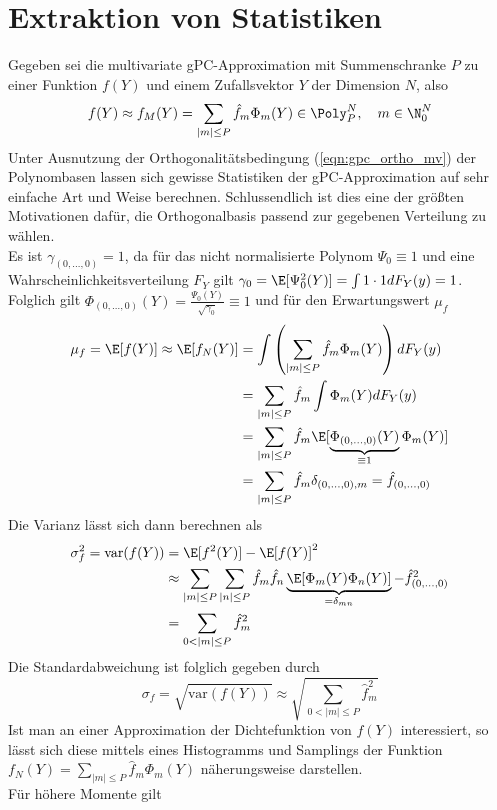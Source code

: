 \section{Extraktion von Statistiken}
Gegeben sei die multivariate gPC-Approximation mit Summenschranke $P$ zu einer Funktion $f(Y)$ und einem Zufallsvektor $Y$ der Dimension $N$, also
\[f(Y)\approx f_M(Y)=\sum_{|m|\le P}\hat{f}_m\Phi_m(Y)\in\Poly_P^N,\quad m\in\N_0^N\]
Unter Ausnutzung der Orthogonalitätsbedingung (\ref{eqn:gpc_ortho_mv}) der Polynombasen lassen sich gewisse Statistiken der gPC-Approximation auf sehr einfache Art und Weise berechnen. Schlussendlich ist dies eine der größten Motivationen dafür, die Orthogonalbasis passend zur gegebenen Verteilung zu wählen.\\
Es ist $\gamma_{(0,\dots,0)}=1$, da für das nicht normalisierte Polynom $\Psi_0\equiv 1$ und eine Wahrscheinlichkeitsverteilung $F_Y$ gilt $\gamma_0=\E[\Psi_0^2(Y)]=\int 1\cdot 1dF_Y(y)=1$. Folglich gilt $\Phi_{(0,\dots,0)}(Y)= \frac{\Psi_0(Y)}{\sqrt{\gamma_0}}\equiv 1$ und für den Erwartungswert $\mu_f$
\begin{equation}
\label{eqn:gpc_approx_exp}
\begin{split}
\mu_f=\E[f(Y)]\approx \E[f_N(Y)]&=\int\left(\sum_{|m|\le P}\hat{f}_m\Phi_m(Y)\right)dF_Y(y)\\
&=\sum_{|m|\le P}\hat{f}_m\int\Phi_m(Y)dF_Y(y)\\
&=\sum_{|m|\le P}\hat{f}_m\E[\underbrace{\Phi_{(0,\dots,0)}(Y)}_{\equiv 1} \Phi_m(Y)]\\
&=\sum_{|m|\le P}\hat{f}_m\delta_{(0,\dots,0),m}=\hat{f}_{(0,\dots,0)}
\end{split}
\end{equation}
Die Varianz lässt sich dann berechnen als
\begin{align*}
\sigma^2_f=\text{var}(f(Y))&=\E[f^2(Y)]-\E[f(Y)]^2\\
&\approx \sum_{|m|\le P}\sum_{|n|\le P}\hat{f}_m\hat{f}_n\underbrace{\E[\Phi_m(Y)\Phi_n(Y)]}_{=\delta_{mn}}-\hat{f}_{(0,\dots,0)}^2\\
&=\sum_{0<|m|\le P}\hat{f}_m^2
\end{align*}
Die Standardabweichung ist folglich gegeben durch
\[\sigma_f=\sqrt{\text{var}(f(Y))}\approx\sqrt{\sum_{0<|m|\le P}\hat{f}_m^2}\]
Ist man an einer Approximation der Dichtefunktion von $f(Y)$ interessiert, so lässt sich diese mittels eines Histogramms und Samplings der Funktion $f_N(Y)=\sum_{|m|\le P}\hat{f}_m\Phi_m(Y)$ näherungsweise darstellen.\\[0.2cm]
Für höhere Momente gilt
